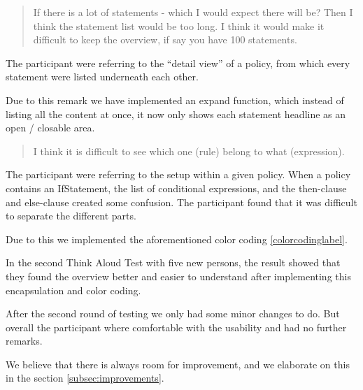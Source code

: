 \begin{quotation}
If there is a lot of statements - which I would expect there will be? Then I think the statement list would be too long. I think it would make it difficult to keep the overview, if say you have 100 statements.
\end{quotation}

The participant were referring to the “detail view” of a policy, from which every statement were listed underneath each other. 

Due to this remark we have implemented an expand function, which instead of listing all the content at once, it now only shows each statement headline as an open / closable area.
 
\begin{quotation}
I think it is difficult to see which one (rule) belong to what (expression).
\end{quotation}

The participant were referring to the setup within a given policy. When a policy contains an IfStatement, the list of conditional expressions, and the then-clause and else-clause created some confusion. The participant found that it was difficult to separate the different parts.

Due to this we implemented the aforementioned color coding \ref{colorcodinglabel}.

In the second Think Aloud Test with five new persons, the result showed that they found the overview better and easier to understand after implementing this encapsulation and color coding.

After the second round of testing we only had some minor changes to do. But overall the participant where comfortable with the usability and had no further remarks.

We believe that there is always room for improvement, and we elaborate on this in the section \ref{subsec:improvements}.